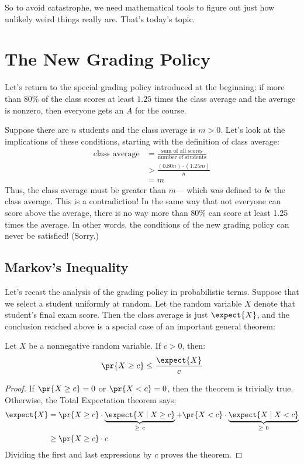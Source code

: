 \begin{editingnotes}
So to avoid catastrophe, we need mathematical tools to figure out just
how unlikely weird things really are.  That's today's topic.

\section{The New Grading Policy}

Let's return to the special grading policy introduced at the
beginning: if more than 80\% of the class scores at least $1.25$ times
the class average and the average is nonzero, then everyone gets an
\textit{A} for the course.

Suppose there are $n$ students and the class average is $m > 0$.
Let's look at the implications of these conditions, starting with the
definition of class average:
%
\begin{align*}
\text{class average}
    & = \frac{\text{sum of all scores}}{\text{number of students}} \\[0.25ex]
    & > \frac{(0.80 n)\cdot(1.25 m)}{n} \\
    & = m
\end{align*}
%
Thus, the class average must be greater than $m$--- which was defined
to \textit{be} the class average.  This is a contradiction!  In the
same way that not everyone can score above the average, there is no
way more than 80\% can score at least 1.25 times the average.  In
other words, the conditions of the new grading policy can never be
satisfied!  (Sorry.)

\subsection{Markov's Inequality}

Let's recast the analysis of the grading policy in probabilistic
terms.  Suppose that we select a student uniformly at random.  Let the
random variable $X$ denote that student's final exam score.  Then the
class average is just $\expect{X}$, and the conclusion reached above is a
special case of an important general theorem:

\begin{theorem}
Let $X$ be a nonnegative random variable.  If $c > 0$, then:
%
\[
\pr{X \geq c} \leq \frac{\expect{X}}{c}
\]
\end{theorem}

\begin{proof}
If $\pr{X \geq c} = 0$ or $\pr{X < c} = 0$, then the theorem is
trivially true.  Otherwise, the Total Expectation theorem says:
%
\begin{align*}
\expect{X} &
    = \pr{X \geq c} \cdot \underbrace{\expect{X \mid X \geq c}}_{\geq\ c}
    + \pr{X < c} \cdot \underbrace{\expect{X \mid X < c}}_{\geq\ 0} \\
  & \geq \pr{X \geq c} \cdot c
\end{align*}
%
Dividing the first and last expressions by $c$ proves the theorem.
\end{proof}


\end{editingnotes}
